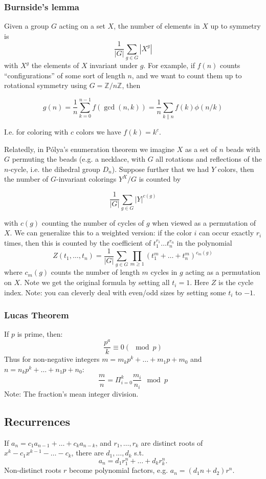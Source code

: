 \documentclass[
	a4paper,
	landscape,
	10pt,
]{article}
\begin{document}
\begin{multicols}{3}
		\subsubsection*{Burnside's lemma}
			Given a group $G$ acting on a set $X$, the number of elements in $X$ up to
			symmetry is $$\frac{1}{|G|}\sum_{g\in G} |X^g|$$ with $X^g$ the elements of
			$X$ invariant under $g$. For example, if $f(n)$ counts ``configurations''
			of some sort of length $n$, and we want to count them up to rotational symmetry
			using $G = \mathbb{Z}/n\mathbb{Z}$, then

			$$g(n) = \frac{1}{n} \sum_{k=0}^{n-1} f(\gcd(n, k))
				= \frac{1}{n}\sum_{k \| n} f(k) \phi(n / k)$$

			I.e. for coloring with $c$ colors we have $f(k) = k^c$.

			Relatedly, in P\'olya's enumeration theorem we imagine $X$ as a set of $n$
			beads with $G$ permuting the beads (e.g. a necklace, with $G$ all rotations and
			reflections of the $n$-cycle, i.e. the dihedral group $D_n$).
			Suppose further that we had $Y$ colors, then
			the number of $G$-invariant colorings $Y^X / G$ is counted by

			$$\frac{1}{|G|}\sum_{g\in G} |Y|^{c(g)}$$

			with $c(g)$ counting the number of cycles of $g$ when viewed as a permutation
			of $X$. We can generalize this to a weighted version: if the color $i$ can
			occur exactly $r_i$ times, then this is counted by the coefficient of
			$t_1^{r_1}\dots t_n^{r_n}$ in the polynomial
			$$Z(t_1,\dots,t_n) = \frac{1}{|G|}\sum_{g\in G} \prod_{m\geq 1}
				(t_1^m+\dots+t_n^m)^{c_m(g)}$$
			where $c_m(g)$ counts the number of length $m$ cycles in $g$ acting as a
			permutation on $X$. Note we get the original formula by setting all $t_i=1$.
			Here $Z$ is the cycle index. Note: you can cleverly deal with even/odd sizes
			by setting some $t_i$ to $-1$.
		
	\subsubsection*{Lucas Theorem}
		If $p$ is prime, then:
		$$ \frac{p^a}{k} \equiv 0 (\mod p) $$
		Thus for non-negative integers $m = m_kp^k + \hdots + m_1 p + m_0$ and $n = n_k p^k + \hdots + n_1p + n_0$:
		$$ \frac{m}{n} =  \Pi_{i=0}^{k} \frac{m_i}{n_i} \mod p $$ Note: The fraction's mean integer division.

    \subsection{Recurrences}
        If $a_n = c_1 a_{n-1} + \dots + c_k a_{n-k}$, and $r_1, \dots, r_k$ are distinct roots of $x^k - c_1 x^{k-1} - \dots - c_k$, there are $d_1, \dots, d_k$ s.t.
        \[a_n = d_1r_1^n + \dots + d_kr_k^n. \]
        Non-distinct roots $r$ become polynomial factors, e.g. $a_n = (d_1n + d_2)r^n$.


\end{multicols}
\end{document}
